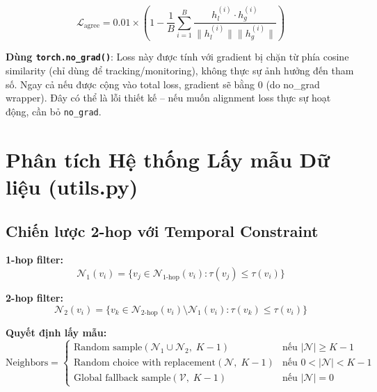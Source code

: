 \documentclass[12pt,a4paper]{article}
\begin{document}
\begin{mathbox}[title={Công thức}]
\begin{equation}
  \mathcal{L}_\text{agree} = 0.01 \times \left(1 - \frac{1}{B}\sum_{i=1}^B
    \frac{h_l^{(i)} \cdot h_g^{(i)}}{\|h_l^{(i)}\|\|h_g^{(i)}\|}\right)
\end{equation}
\end{mathbox}

\begin{insightbox}
\textbf{Dùng \texttt{torch.no\_grad()}}:  Loss này được tính với gradient bị
chặn từ phía cosine similarity (chỉ dùng để tracking/monitoring), không thực
sự ảnh hưởng đến tham số. Ngay cả nếu được cộng vào total loss, gradient
sẽ bằng 0 (do no\_grad wrapper). Đây có thể là lỗi thiết kế -- nếu muốn
alignment loss thực sự hoạt động, cần bỏ \texttt{no\_grad}.
\end{insightbox}

\section{Phân tích Hệ thống Lấy mẫu Dữ liệu (utils.py)}

\subsection{Chiến lược 2-hop với Temporal Constraint}

\begin{mathbox}[title={Bất đẳng thức thời gian trong lấy mẫu}]
\textbf{1-hop filter:}
\begin{equation}
  \mathcal{N}_1(v_i) = \{v_j \in \mathcal{N}_{1\text{-hop}}(v_i) : \tau(v_j) \le \tau(v_i)\}
\end{equation}

\textbf{2-hop filter:}
\begin{equation}
  \mathcal{N}_2(v_i) = \{v_k \in \mathcal{N}_{2\text{-hop}}(v_i)
    \setminus \mathcal{N}_1(v_i) : \tau(v_k) \le \tau(v_i)\}
\end{equation}

\textbf{Quyết định lấy mẫu:}
\begin{equation}
  \text{Neighbors} = \begin{cases}
    \text{Random sample}(\mathcal{N}_1 \cup \mathcal{N}_2,\; K-1)
      & \text{nếu } |\mathcal{N}| \ge K-1 \\
    \text{Random choice with replacement}(\mathcal{N},\; K-1)
      & \text{nếu } 0 < |\mathcal{N}| < K-1 \\
    \text{Global fallback sample}(\mathcal{V},\; K-1)
      & \text{nếu } |\mathcal{N}| = 0
  \end{cases}
\end{equation}
\end{mathbox}
\end{document}
